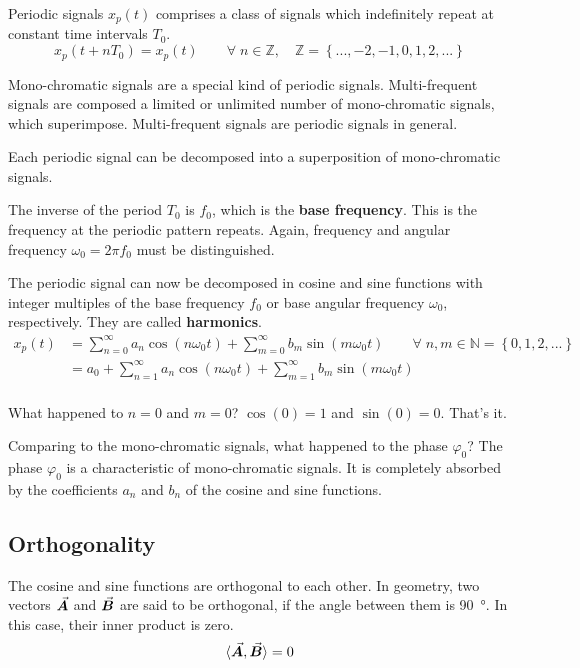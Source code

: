 \begin{refsection}
Periodic signals $x_p(t)$ comprises a class of signals which indefinitely repeat at constant time intervals $T_0$.
\begin{equation}
	x_p(t + n T_0) = x_p(t) \qquad \forall \; n \in \mathbb{Z}, \quad \mathbb{Z} = \left\{..., -2, -1, 0, 1, 2, ...\right\}
\end{equation}

Mono-chromatic signals are a special kind of periodic signals. Multi-frequent signals are composed a limited or unlimited number of mono-chromatic signals, which superimpose. Multi-frequent signals are periodic signals in general.

\begin{fact}
	Each periodic signal can be decomposed into a superposition of mono-chromatic signals.
\end{fact}

The inverse of the period $T_0$ is $f_0$, which is the \textbf{base frequency}. This is the frequency at the periodic pattern repeats. Again, frequency and angular frequency $\omega_0 = 2 \pi f_0$ must be distinguished.

The periodic signal can now be decomposed in cosine and sine functions with integer multiples of the base frequency $f_0$ or base angular frequency $\omega_0$, respectively. They are called  \textbf{harmonics}.
\begin{equation}
	\begin{split}
		x_p(t) &= \sum\limits_{n=0}^{\infty} a_n \cos\left(n \omega_0 t\right) + \sum\limits_{m=0}^{\infty} b_m \sin\left(m \omega_0 t\right) \qquad \forall \; n, m \in \mathbb{N} = \left\{0, 1, 2, ...\right\} \\
		 &= a_0 + \sum\limits_{n=1}^{\infty} a_n \cos\left(n \omega_0 t\right) + \sum\limits_{m=1}^{\infty} b_m \sin\left(m \omega_0 t\right) \\
	\end{split}
	\label{eq:ch02:fourier_series}
\end{equation}

What happened to $n = 0$ and $m = 0$? $\cos(0) = 1$ and $\sin(0) = 0$. That's it.

Comparing to the mono-chromatic signals, what happened to the phase $\varphi_0$? The phase $\varphi_0$ is a characteristic of mono-chromatic signals. It is completely absorbed by the coefficients $a_n$ and $b_n$ of the cosine and sine functions.

\subsection{Orthogonality}
The cosine and sine functions are orthogonal to each other. In geometry, two vectors $\vec{\bm{A}}$ and $\vec{\bm{B}}$ are said to be orthogonal, if the angle between them is \SI{90}{\degree}. In this case, their inner product is zero.
\begin{equation}
	\langle \vec{\bm{A}}, \vec{\bm{B}} \rangle = 0
\end{equation}


\end{refsection}
